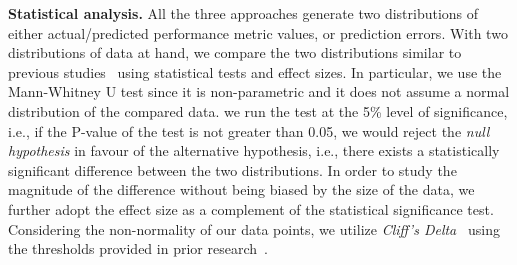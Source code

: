 


\noindent\textbf{Statistical analysis.}
All the three approaches generate two distributions of either actual/predicted performance metric values, or prediction errors. With two distributions of data at hand, we compare the two distributions similar to previous studies~\citep{Chen:2016:CHD:2950290.2950303} using statistical tests and effect sizes. In particular, we use the Mann-Whitney U test since it is non-parametric and it does not assume a normal distribution of the compared data. we run the test at the 5\% level of significance, i.e., if the P-value of the test is not greater than 0.05, we would reject the \emph{null hypothesis} in favour of the alternative hypothesis, i.e., there exists a statistically significant difference between the two distributions. In order to study the magnitude of the difference without being biased by the size of the data, we further adopt the effect size  as a complement
of the statistical significance test. Considering the non-normality of our data points, we
utilize \emph{Cliff's Delta}~\citep{cliff1996ordinal} using the
thresholds provided in prior research~\citep{romano2006appropriate}.


